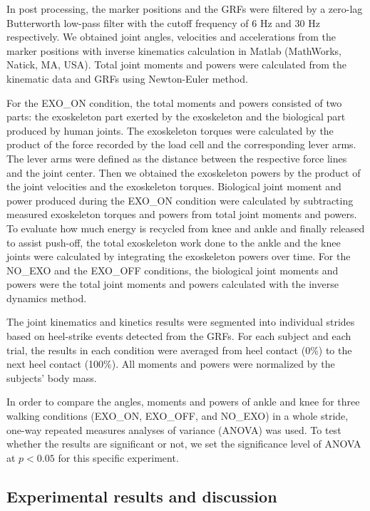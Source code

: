 \documentclass[twocolumn,cleanfoot,10pt]{asme2ej}
\begin{document}
In post processing, the marker positions and the GRFs were filtered by a zero-lag Butterworth low-pass filter with the cutoff frequency of 6 Hz and 30 Hz respectively. We obtained joint angles, velocities and accelerations from the marker positions with inverse kinematics calculation in Matlab (MathWorks, Natick, MA, USA). Total joint moments and powers were calculated from the kinematic data and GRFs using Newton-Euler method. 

For the EXO\_ON condition, the total moments and powers consisted of two parts: the exoskeleton part exerted by the exoskeleton and the biological part produced by human joints. The exoskeleton torques were calculated by the product of the force recorded by the load cell and the corresponding lever arms. The lever arms were defined as the distance between the respective force lines and the joint center. Then we obtained the exoskeleton powers by the product of the joint velocities and the exoskeleton torques. Biological joint moment and power produced during the EXO\_ON condition were calculated by subtracting measured exoskeleton torques and powers from total joint moments and powers. To evaluate how much energy is recycled from knee and ankle and finally released to assist push-off, the total exoskeleton work done to the ankle and the knee joints were calculated by integrating the exoskeleton powers over time. For the NO\_EXO and the EXO\_OFF conditions, the biological joint moments and powers were the total joint moments and powers calculated with the inverse dynamics method.

The joint kinematics and kinetics results were segmented into individual strides based on heel-strike events detected from the GRFs. For each subject and each trial, the results in each condition were averaged from heel contact (0\%) to the next heel contact (100\%). All moments and powers were normalized by the subjects’ body mass.

In order to compare the angles, moments and powers of ankle and knee for three walking conditions (EXO\_ON, EXO\_OFF, and NO\_EXO) in a whole stride, one-way repeated measures analyses of variance (ANOVA) was used. To test whether the results are significant or not, we set the significance level of ANOVA at $p<0.05$ for this specific experiment. 

\subsection{Experimental results and discussion}
\end{document}
